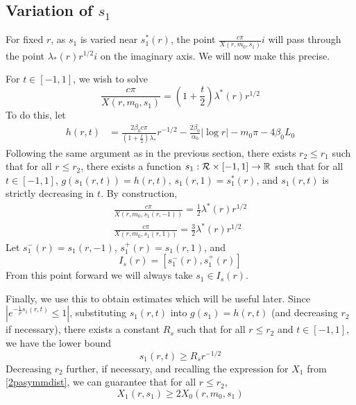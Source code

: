 \documentclass[thesis.tex]{subfiles}
\begin{document}
\subsection{Variation of $s_1$}

For fixed $r$, as $s_1$ is varied near $s_1^*(r)$, the point $\frac{c \pi}{X(r, m_0, s_1)} i$ will pass through the point $\lambda_*(r) r^{1/2}i$ on the imaginary axis. We will now make this precise.

For $t \in [-1, 1]$, we wish to solve
\begin{equation}\label{solvefors2}
\frac{c \pi}{X(r, m_0, s_1)} = \left(1 + \frac{t}{2} \right)\lambda^*(r) r^{1/2}
\end{equation}
To do this, let
\begin{align*}
h(r, t) &= \frac{2 \beta_0 c \pi}{\left( 1 + \frac{t}{2} \right) \lambda_*} r^{-1/2} - \frac{2 \beta_0}{\alpha_0} |\log r| - m_0 \pi - 4 \beta_0 L_0
\end{align*}
Following the same argument as in the previous section, there exists $r_2 \leq r_1$ such that for all $r \leq r_2$, there exists a function $s_1: \mathcal{R} \times [-1, 1] \rightarrow \mathbb{R}$ such that for all $t \in [-1, 1]$, $g(s_1(r, t)) = h(r, t)$, $s_1(r, 1) = s_1^*(r)$, and $s_1(r, t)$ is strictly decreasing in $t$. By construction,
\begin{align*}
\frac{c \pi}{X(r, m_0, s_1(r, -1))} = \frac{1}{2} \lambda^*(r) r^{1/2} \\
\frac{c \pi}{X(r, m_0, s_1(r, 1))} = \frac{3}{2} \lambda^*(r) r^{1/2}
\end{align*}
Let $s_1^-(r) = s_1(r, -1)$, $s_1^+(r) = s_1(r, 1)$, and 
\[
I_s(r) = [s_1^-(r), s_1^+(r)]
\]
From this point forward we will always take $s_1 \in I_s(r)$.

Finally, we use this to obtain estimates which will be useful later. Since $|e^{-\frac{1}{\rho}s_1(r,t)} \leq 1|$, substituting $s_1(r, t)$ into $g(s_1) = h(r, t)$ (and decreasing $r_2$ if necessary), there exists a constant $R_s$ such that for all $r \leq r_2$ and $t \in [-1, 1]$, we have the lower bound
\begin{equation}\label{s1starLB}
s_1(r, t) \geq R_s r^{-1/2}
\end{equation}
Decreasing $r_2$ further, if necessary, and recalling the expression for $X_1$ from \cref{2pasymmdist}, we can guarantee that for all $r \leq r_2$, 
\begin{equation}\label{X0X1compare}
X_1(r, s_1) \geq 2 X_0(r, m_0, s_1)
\end{equation}
\end{document}
